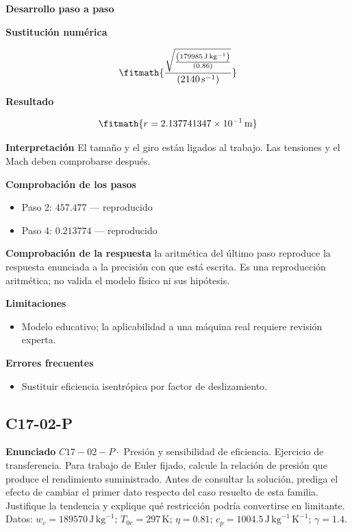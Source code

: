 \documentclass[10pt,openany]{book}
\begin{document}
\noindent\textbf{Desarrollo paso a paso}



\noindent\textbf{Sustitución numérica}

\[
\fitmath{\frac{\sqrt{\frac{\left(179985\,\mathrm{J}\,\mathrm{kg}^{-1}\right)}{\left(0.86\right)}}}{\left(2140\,\mathrm{s}^{-1}\right)}}
\]

\noindent\textbf{Resultado}

\[
\fitmath{r=2.137741347\times10^{-1}\,\mathrm{m}}
\]

\noindent\textbf{Interpretación}
El tamaño y el giro están ligados al trabajo. Las tensiones y el Mach deben comprobarse después.

\noindent\textbf{Comprobación de los pasos}
\begin{itemize}
\item Paso 2: $457.477$ — reproducido
\item Paso 4: $0.213774$ — reproducido
\end{itemize}

\noindent\textbf{Comprobación de la respuesta} la aritmética del último paso reproduce la respuesta enunciada a la precisión con que está escrita. Es una reproducción aritmética; no valida el modelo físico ni sus hipótesis.

\noindent\textbf{Limitaciones}
\begin{itemize}
\item Modelo educativo; la aplicabilidad a una máquina real requiere revisión experta.
\end{itemize}

\noindent\textbf{Errores frecuentes}
\begin{itemize}
\item Sustituir eficiencia isentrópica por factor de deslizamiento.
\end{itemize}
\subsection*{C17-02-P}

\noindent\textbf{Enunciado}
\(C17-02-P \cdot\) Presión y sensibilidad de eficiencia. Ejercicio de transferencia. Para trabajo de Euler fijado, calcule la relación de presión que produce el rendimiento suministrado. Antes de consultar la solución, prediga el efecto de cambiar el primer dato respecto del caso resuelto de esta familia. Justifique la tendencia y explique qué restricción podría convertirse en limitante. Datos: \(w_c=189570\, \mathrm{J}\,\mathrm{kg}^{-1}\); \(T_{0e}=297\, \mathrm{K}\); \(\eta=0.81\); \(c_p=1004.5\, \mathrm{J}\,\mathrm{kg}^{-1}\,\mathrm{K}^{-1}\); \(\gamma=1.4\).
\end{document}
